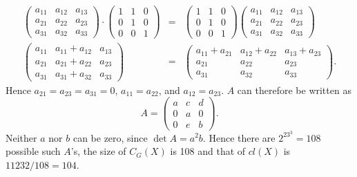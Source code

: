 \documentclass[11pt]{article} \usepackage{amssymb}
\begin{document}
\begin{enumerate}
\begin{enumerate}
\begin{itemize}
        \begin{eqnarray*}
          \begin{pmatrix}
            a_{11}&a_{12}  &a_{13} \\ 
            a_{21}&a_{22}  &a_{23} \\ 
            a_{31}&a_{32}  &a_{33} 
          \end{pmatrix}
          \cdot
          \begin{pmatrix}
            1&1  &0 \\ 
            0&1  &0 \\ 
            0&0  &1 
          \end{pmatrix}
          &=&
          \begin{pmatrix}
            1&1  &0 \\ 
            0&1  &0 \\ 
            0&0  &1 
          \end{pmatrix}
          \begin{pmatrix}
            a_{11}&a_{12}  &a_{13} \\ 
            a_{21}&a_{22}  &a_{23} \\ 
            a_{31}&a_{32}  &a_{33} 
          \end{pmatrix}
          \\
          \begin{pmatrix}
            a_{11}&a_{11}+a_{12}  &a_{13} \\ 
            a_{21}&a_{21}+a_{22}  &a_{23} \\ 
            a_{31}&a_{31}+a_{32}  &a_{33} 
          \end{pmatrix}
          &=&
          \begin{pmatrix}
            a_{11}+a_{21}&a_{12}+a_{22}  &a_{13}+a_{23} \\ 
            a_{21}&a_{22}  &a_{23} \\ 
            a_{31}&a_{32}  &a_{33} 
          \end{pmatrix}.
        \end{eqnarray*}
        Hence $a_{21}=a_{23}=a_{31}=0$, $a_{11}=a_{22}$, and $a_{12}=a_{23}$. 
        $A$ can therefore be written as
        \begin{equation*}
          A=
          \begin{pmatrix}
            a &c  &d \\ 
            0 &a  &0 \\ 
            0 &e  &b 
          \end{pmatrix}.
        \end{equation*}
        Neither $a$ nor $b$ can be zero, since $\det A=a^2b$. Hence there
        are $2^23^3=108$ possible such $A$'s, the size of $C_G(X)$ is 108
        and that of  $cl(X)$ is $11232/108=104$.


\end{itemize}
\end{enumerate}
\end{enumerate}
\end{document}
